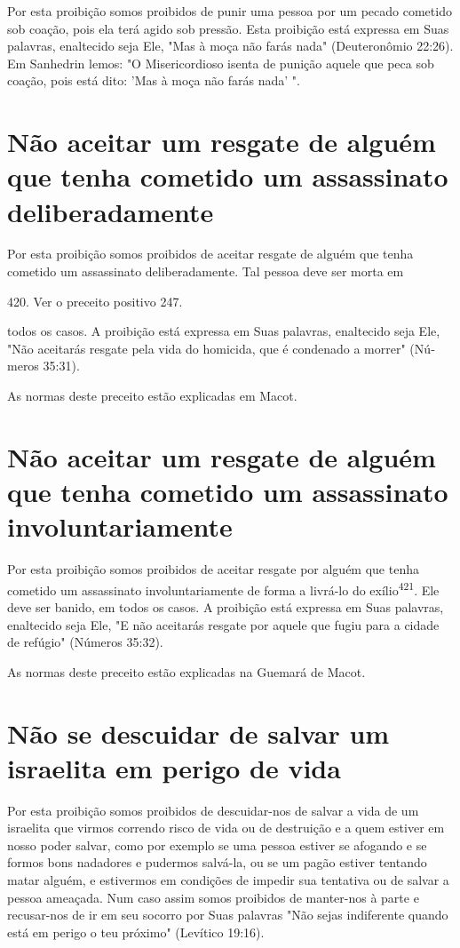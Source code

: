 Por esta proibição somos proibidos de punir uma pessoa por um pe­cado
cometido sob coação, pois ela terá agido sob pressão. Esta proibição
está expressa em Suas palavras, enaltecido seja Ele, "Mas à moça não
farás nada" (Deuteronômio 22:26). Em Sanhedrin lemos: "O Misericordioso
isenta de pu­nição aquele que peca sob coação, pois está dito: 'Mas à
moça não farás nada' ".

\section{Não aceitar um resgate de alguém que tenha 
cometido um assassinato deliberadamente}

Por esta proibição somos proibidos de aceitar resgate de alguém que
tenha cometido um assassinato deliberadamente. Tal pessoa deve ser morta
em

420. Ver o preceito positivo 247.

todos os casos. A proibição está expressa em Suas palavras, enaltecido
seja Ele, "Não aceitarás resgate pela vida do homicida, que é condenado
a morrer" (Nú­meros 35:31).

As normas deste preceito estão explicadas em Macot.

\section{Não aceitar um resgate de alguém que tenha cometido 
um assassinato involuntariamente}

Por esta proibição somos proibidos de aceitar resgate por alguém que
tenha cometido um assassinato involuntariamente de forma a livrá-lo do
exílio\textsuperscript{421}. Ele deve ser banido, em todos os casos. A
proibição está expressa em Suas palavras, enaltecido seja Ele, "E não
aceitarás resgate por aquele que fugiu para a cidade de refúgio"
(Números 35:32).


As normas deste preceito estão explicadas na Guemará de Macot.

\section{Não se descuidar de salvar um israelita em perigo de vida}

Por esta proibição somos proibidos de descuidar-nos de salvar a vi­da de
um israelita que virmos correndo risco de vida ou de destruição e a quem
estiver em nosso poder salvar, como por exemplo se uma pessoa estiver se
afo­gando e se formos bons nadadores e pudermos salvá-la, ou se um pagão
estiver tentando matar alguém, e estivermos em condições de impedir sua
tentativa ou de salvar a pessoa ameaçada. Num caso assim somos proibidos
de manter-nos à parte e recusar-nos de ir em seu socorro por Suas
palavras "Não sejas in­diferente quando está em perigo o teu próximo"
(Levítico 19:16).


